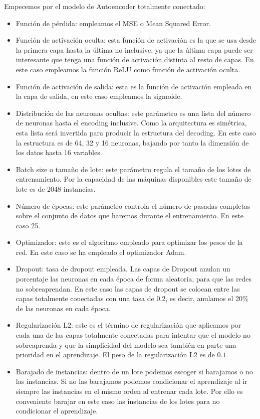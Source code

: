 Empecemos por el modelo de Autoencoder totalmente conectado:
\begin{itemize}
	\item Función de pérdida: empleamos el MSE o Mean Squared Error.
	\item Función de activación oculta: esta función de activación es la que se usa desde la primera capa hasta la última no inclusive, ya que la última capa puede ser interesante que tenga una función de activación distinta al resto de capas. En este caso empleamos la función ReLU como función de activación oculta.
	\item Función de activación de salida: esta es la función de activación empleada en la capa de salida, en este caso empleamos la sigmoide.
	\item Distribución de las neuronas ocultas: este parámetro es una lista del número de neuronas hasta el encoding inclusive. Como la arquitectura es simétrica, esta lista será invertida para producir la estructura del decoding. En este caso la estructura es de 64, 32 y 16 neuronas, bajando por tanto la dimensión de los datos hasta 16 variables.
	\item Batch size o tamaño de lote: este parámetro regula el tamaño de los lotes de entrenamiento. Por la capacidad de las máquinas disponibles este tamaño de lote es de 2048 instancias.
	\item Número de épocas: este parámetro controla el número de pasadas completas sobre el conjunto de datos que haremos durante el entrenamiento. En este caso 25.
	\item Optimizador: este es el algoritmo empleado para optimizar los pesos de la red. En este caso se ha empleado el optimizador Adam.
	\item Dropout: tasa de dropout empleada. Las capas de Dropout anulan un porcentaje las neuronas en cada época de forma aleatoria, para que las redes no sobreaprendan. En este caso las capas de dropout se colocan entre las capas totalmente conectadas con una tasa de $0.2$, es decir, anulamos el 20\% de las neuronas en cada época.
	\item Regularización L2: este es el término de regularización que aplicamos por cada una de las capas totalmente conectadas para intentar que el modelo no sobreaprenda y que la simplicidad del modelo sea también en parte una prioridad en el aprendizaje. El peso de la regularización L2 es de $0.1$.
	\item Barajado de instancias: dentro de un lote podemos escoger si barajamos o no las instancias. Si no las barajamos podemos condicionar el aprendizaje al ir siempre las instancias en el mismo orden al entrenar cada lote. Por ello es conveniente barajar en este caso las instancias de los lotes para no condicionar el aprendizaje.
\end{itemize}


